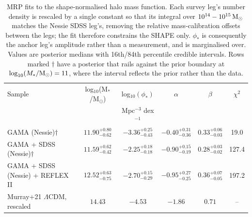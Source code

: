 \begin{table}
\centering
\caption{MRP fits to the shape-normalised halo mass function.  Each survey leg's number density is rescaled by a single constant so that its integral over $10^{14}-10^{15}\,{\rm M}_\odot$ matches the Nessie SDSS leg's, removing the relative mass-calibration offsets between the legs; the fit therefore constrains the SHAPE only.  $\phi_*$ is consequently the anchor leg's amplitude rather than a measurement, and is marginalised over.  Values are posterior medians with 16th/84th percentile credible intervals.  Rows marked $\dagger$ have a posterior that rails against the prior boundary at $\log_{10}(M_*/{\rm M}_\odot) = 11$, where the interval reflects the prior rather than the data.}
\begin{tabular}{lccccc}
\hline
Sample & log$_{10}$(M$_*$/M$_\odot$) & log$_{10}(\phi_*)$ & $\alpha$ & $\beta$ & $\chi^2$ \\
 & & Mpc$^{-3}$ dex$^{-1}$ & & & \\
\hline
GAMA (Nessie)$\dagger$ & $11.90^{+0.80}_{-0.62}$ & $-3.36^{+0.25}_{-0.43}$ & $-0.40^{+0.31}_{-0.36}$ & $0.33^{+0.06}_{-0.03}$ & 19.0 \\
GAMA + SDSS (Nessie)$\dagger$ & $11.59^{+0.62}_{-0.42}$ & $-2.25^{+0.18}_{-0.18}$ & $-0.90^{+0.15}_{-0.19}$ & $0.28^{+0.03}_{-0.02}$ & 127.4 \\
GAMA + SDSS (Nessie) + REFLEX II & $12.52^{+0.63}_{-0.75}$ & $-2.70^{+0.15}_{-0.29}$ & $-0.95^{+0.27}_{-0.25}$ & $0.36^{+0.07}_{-0.05}$ & 197.2 \\
\hline
Murray+21 $\Lambda$CDM, rescaled & $14.43$ & $-4.53$ & $-1.86$ & $0.71$ & -- \\
\hline
\end{tabular}
\label{tab:mrp_shape}
\end{table}
